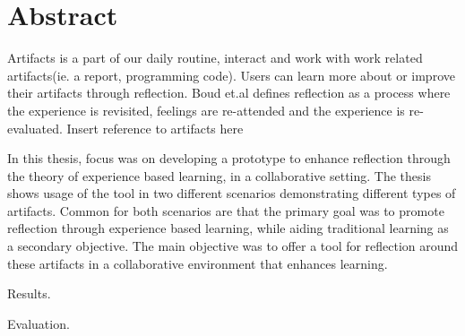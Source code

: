 \chapter*{Abstract}
Artifacts is a part of our daily routine, interact and work with work related artifacts(ie. a report, programming code). Users can learn more about or improve their artifacts through reflection. Boud et.al defines reflection as a process where the experience is revisited, feelings are re-attended and the experience is re-evaluated\cite{boudreflection1985}. 
Insert reference to artifacts here

In this thesis, focus was on developing a prototype to enhance reflection through the theory of experience based learning, in a collaborative setting. The thesis shows usage of the tool in two different scenarios demonstrating different types of artifacts. Common for both scenarios are that the primary goal was to promote reflection through experience based learning, while aiding traditional learning as a secondary objective. 
The main objective was to offer a tool for reflection around these artifacts in a collaborative environment that enhances learning. 

Results.

Evaluation.